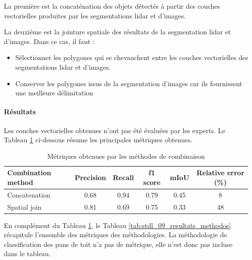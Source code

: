 \par{La première est la concaténation des objets détectés à partir des couches vectorielles produites par les segmentations \gls{lidar} et d'images.}

\par{La deuxième est la jointure spatiale des résultats de la segmentation \gls{lidar} et d'images. Dans ce cas, il faut :}
\begin{itemize}
    \item Sélectionner les polygones qui se chevauchent entre les couches vectorielles des segmentations \gls{lidar} et d'images.
    \item Conserver les polygones issus de la segmentation d'images car ils fournissent une meilleure délimitation
\end{itemize}
\newpage
\paragraph{Résultats}

\par{Les couches vectorielles obtenues n'ont pas été évaluées par les experts. Le Tableau \ref{tab:stdl_08_ensemble_resultats} ci-dessous résume les principales métriques obtenues.}

\begin{table}[H]
    \centering
    \begin{tabular}{|l|c|c|c|c|c|}
    \hline
    Combination method & Precision & Recall & f1 score & mIoU & Relative error (\%) \\
    \hline
    Concatenation & 0.68 & 0.94 & 0.79 & 0.45 & 8 \\
    Spatial join & 0.81 & 0.69 & 0.75 & 0.33 & 48 \\
    \hline
    \end{tabular}
    \caption{Métriques obtenues par les méthodes de combinaison}
    \label{tab:stdl_08_ensemble_resultats}
\end{table}

\par{En complément du Tableau \ref{tab:stdl_08_ensemble_resultats}, le Tableau \ref{tab:stdl_09_resultats_methodos} récapitule l'ensemble des métriques des méthodologies. La méthodologie de classification des pans de toit n'a pas de métrique, elle n'est donc pas incluse dans le tableau.}

